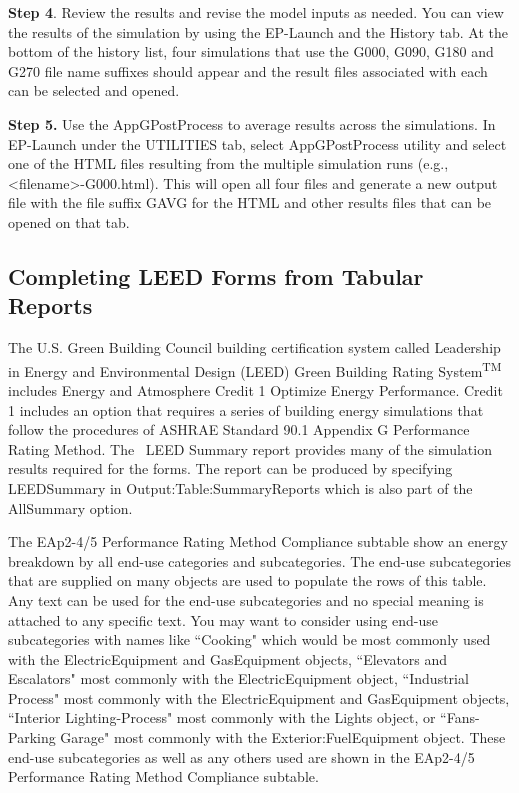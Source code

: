\textbf{Step 4}. Review the results and revise the model inputs as needed. You can view the results of the simulation by using the EP-Launch and the History tab. At the bottom of the history list, four simulations that use the G000, G090, G180 and G270 file name suffixes should appear and the result files associated with each can be selected and opened.

\textbf{Step 5.} Use the AppGPostProcess to average results across the simulations. In EP-Launch under the UTILITIES tab, select AppGPostProcess utility and select one of the HTML files resulting from the multiple simulation runs (e.g., \textless{}filename\textgreater{}-G000.html). This will open all four files and generate a new output file with the file suffix GAVG for the HTML and other results files that can be opened on that tab.

\subsection{Completing LEED Forms from Tabular Reports}\label{completing-leed-forms-from-tabular-reports}

The U.S. Green Building Council building certification system called Leadership in Energy and Environmental Design (LEED) Green Building Rating System\textsuperscript{TM} includes Energy and Atmosphere Credit 1 Optimize Energy Performance. Credit 1 includes an option that requires a series of building energy simulations that follow the procedures of ASHRAE Standard 90.1 Appendix G Performance Rating Method. The~ LEED Summary report provides many of the simulation results required for the forms. The report can be produced by specifying LEEDSummary in Output:Table:SummaryReports which is also part of the AllSummary option.

The EAp2-4/5 Performance Rating Method Compliance subtable show an energy breakdown by all end-use categories and subcategories. The end-use subcategories that are supplied on many objects are used to populate the rows of this table. Any text can be used for the end-use subcategories and no special meaning is attached to any specific text. You may want to consider using end-use subcategories with names like ``Cooking" which would be most commonly used with the ElectricEquipment and GasEquipment objects, ``Elevators and Escalators" most commonly with the ElectricEquipment object, ``Industrial Process" most commonly with the ElectricEquipment and GasEquipment objects, ``Interior Lighting-Process" most commonly with the Lights object, or ``Fans-Parking Garage" most commonly with the Exterior:FuelEquipment object. These end-use subcategories as well as any others used are shown in the EAp2-4/5 Performance Rating Method Compliance subtable.

